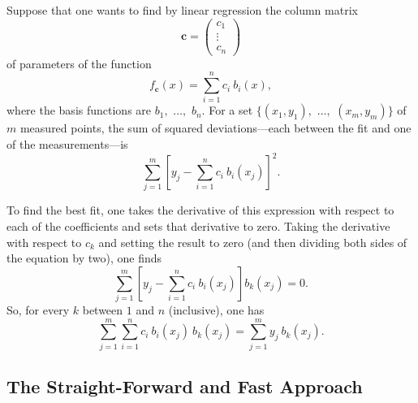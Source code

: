 \documentclass[twocolumn]{article}
\begin{document}
Suppose that one wants to find by linear regression the column matrix
\begin{equation}
   \mathbf{c} =
   \begin{pmatrix}
      c_1\\
      \vdots\\
      c_n
   \end{pmatrix}
\end{equation}
of parameters of the function
\begin{equation}
   f_{\mathbf{c}}(x) = \sum_{i=1}^{n} c_i \: b_i(x),
\end{equation}
where the basis functions are $b_1,$ $\ldots,$ $b_n$. For a set $\{(x_1,y_1),$
$\ldots,$ $(x_m,y_m)\}$ of $m$ measured points, the sum of squared
deviations---each between the fit and one of the measurements---is
\begin{equation}
   \sum_{j=1}^{m} \left[ y_j - \sum_{i=1}^{n} c_i \: b_i(x_j) \right]^2.
\end{equation}

To find the best fit, one takes the derivative of this expression with respect
to each of the coefficients and sets that derivative to zero. Taking the
derivative with respect to $c_k$ and setting the result to zero (and then
dividing both sides of the equation by two), one finds
\begin{equation}
   \sum_{j=1}^{m} \left[ y_j - \sum_{i=1}^{n} c_i \: b_i(x_j) \right] b_k(x_j)
   = 0.
\end{equation}
So, for every $k$ between $1$ and $n$ (inclusive), one has
\begin{equation}
   \sum_{j=1}^{m} \sum_{i=1}^{n} c_i \: b_i(x_j) \: b_k(x_j) = \sum_{j=1}^{m}
   y_j \: b_k(x_j).
   \label{eq:deriv-result}
\end{equation}

\subsection{The Straight-Forward and Fast Approach}
\end{document}
